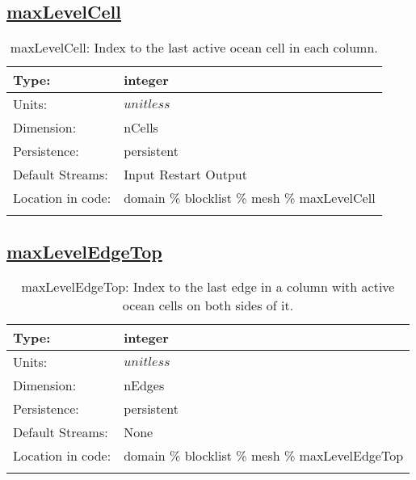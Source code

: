\subsection[maxLevelCell]{\hyperref[sec:var_tab_mesh]{maxLevelCell}}
\label{subsec:var_sec_mesh_maxLevelCell}
\begin{center}
\begin{longtable}{| p{2.0in} | p{4.0in} |}
        \hline 
        Type: & integer \\
        \hline 
        Units: & $unitless$ \\
        \hline 
        Dimension: & nCells \\
        \hline 
        Persistence: & persistent \\
        \hline 
		 Default Streams: & Input Restart Output  \\
        \hline 
		 Location in code: & domain \% blocklist \% mesh \% maxLevelCell \\
		 \hline 
    \caption{maxLevelCell: Index to the last active ocean cell in each column.}
\end{longtable}
\end{center}
\subsection[maxLevelEdgeTop]{\hyperref[sec:var_tab_mesh]{maxLevelEdgeTop}}
\label{subsec:var_sec_mesh_maxLevelEdgeTop}
\begin{center}
\begin{longtable}{| p{2.0in} | p{4.0in} |}
        \hline 
        Type: & integer \\
        \hline 
        Units: & $unitless$ \\
        \hline 
        Dimension: & nEdges \\
        \hline 
        Persistence: & persistent \\
        \hline 
		 Default Streams: & None \\
        \hline 
		 Location in code: & domain \% blocklist \% mesh \% maxLevelEdgeTop \\
		 \hline 
    \caption{maxLevelEdgeTop: Index to the last edge in a column with active ocean cells on both sides of it.}
\end{longtable}
\end{center}
